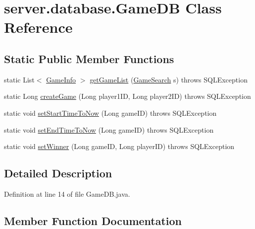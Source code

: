 \hypertarget{classserver_1_1database_1_1_game_d_b}{}\section{server.\+database.\+Game\+DB Class Reference}
\label{classserver_1_1database_1_1_game_d_b}
\subsection*{Static Public Member Functions}
\begin{DoxyCompactItemize}
\item 
static List$<$ \hyperlink{classsharedlib_1_1tuples_1_1_game_info}{Game\+Info} $>$ \hyperlink{classserver_1_1database_1_1_game_d_b_a97341282dd0f89b2842dc03fd460a1b5}{get\+Game\+List} (\hyperlink{classsharedlib_1_1tuples_1_1_game_search}{Game\+Search} s)  throws S\+Q\+L\+Exception 
\item 
static Long \hyperlink{classserver_1_1database_1_1_game_d_b_ab77073e390b71c37e8d0a84c05878992}{create\+Game} (Long player1\+ID, Long player2\+ID)  throws S\+Q\+L\+Exception 
\item 
static void \hyperlink{classserver_1_1database_1_1_game_d_b_a399d52aa4d6f47bd4024568835f35007}{set\+Start\+Time\+To\+Now} (Long game\+ID)  throws S\+Q\+L\+Exception 
\item 
static void \hyperlink{classserver_1_1database_1_1_game_d_b_ab406be179c25bb8bfd87ecf3cda383c2}{set\+End\+Time\+To\+Now} (Long game\+ID)  throws S\+Q\+L\+Exception 
\item 
static void \hyperlink{classserver_1_1database_1_1_game_d_b_ae64f3d1aca34959c83a73dbb5da7f82b}{set\+Winner} (Long game\+ID, Long player\+ID)  throws S\+Q\+L\+Exception 
\end{DoxyCompactItemize}


\subsection{Detailed Description}


Definition at line 14 of file Game\+D\+B.\+java.



\subsection{Member Function Documentation}
\hypertarget{classserver_1_1database_1_1_game_d_b_ab77073e390b71c37e8d0a84c05878992}{}\label{classserver_1_1database_1_1_game_d_b_ab77073e390b71c37e8d0a84c05878992} 

